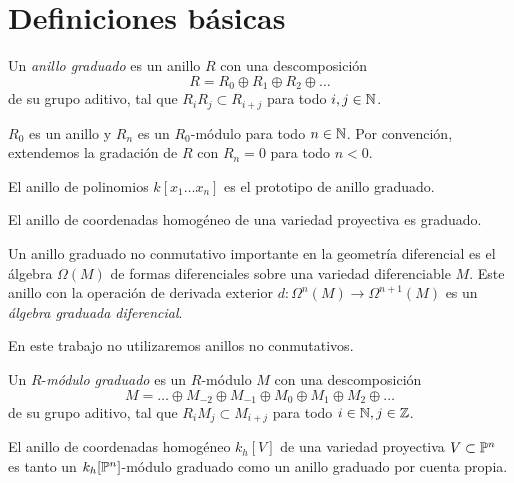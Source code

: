 \section{Definiciones básicas}

\begin{definition}
Un \textit{anillo graduado} es un anillo $R$ con una descomposición
$$R = R_0 \oplus R_1 \oplus R_2 \oplus \dots$$
de su grupo aditivo, tal que $R_i R_j \subset R_{i+j}$ para todo $i, j \in \N$.
\end{definition}

\begin{remark}
$R_0$ es un anillo y $R_n$ es un $R_0$-módulo para todo $n \in \N$. Por convención, extendemos la gradación de $R$ con $R_n = 0$ para todo $n <0$.
\end{remark}

\begin{example}
El anillo de polinomios $k[x_1 \dots x_n]$ es el prototipo de anillo graduado.
\end{example}

\begin{example}
El anillo de coordenadas homogéneo de una variedad proyectiva es graduado.
\end{example}

\begin{example}
Un anillo graduado no conmutativo importante en la geometría diferencial es el álgebra $\Omega(M)$ de formas diferenciales sobre una variedad diferenciable $M$. Este anillo con la operación de derivada exterior $d : \Omega^n(M) \to \Omega^{n+1}(M)$ es un \textit{álgebra graduada diferencial}.
\end{example}

\begin{remark}
En este trabajo no utilizaremos anillos no conmutativos.
\end{remark}

\begin{definition}
Un $R$-\textit{módulo graduado} es un $R$-módulo $M$ con una descomposición
$$M = \dots \oplus M_{-2} \oplus M_{-1} \oplus M_0 \oplus M_1 \oplus M_2 \oplus \dots$$
de su grupo aditivo, tal que $R_i M_j \subset M_{i+j}$ para todo $i \in \N, j \in \Z$.
\end{definition}

\begin{example}
El anillo de coordenadas homogéneo $k_h[V]$ de una variedad proyectiva $V \subset \P^n$ es tanto un $k_h[\P^n]$-módulo graduado como un anillo graduado por cuenta propia.
\end{example}

